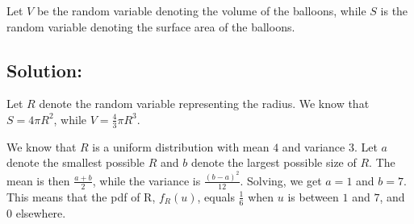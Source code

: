 \documentclass{article}
\begin{document}
Let $V$ be the random variable denoting the volume of the balloons, while $S$ is the random variable denoting the surface area of the balloons.

\subsection{Solution:}

Let $R$ denote the random variable representing the radius. We know that $S = 4 \pi R^2$, while $V = \frac{4}{3} \pi R^3$.

We know that $R$ is a uniform distribution with mean $4$ and variance $3$. Let $a$ denote the smallest possible $R$ and $b$ denote the largest possible size of $R$. The mean is then $\frac{a + b}{2}$, while the variance is $\frac{(b - a)^2}{12}$. Solving, we get $a = 1$ and $b = 7$. This means that the pdf of R, $f_R(u)$, equals $\frac{1}{6}$ when $u$ is between $1$ and $7$, and $0$ elsewhere.
\end{document}

